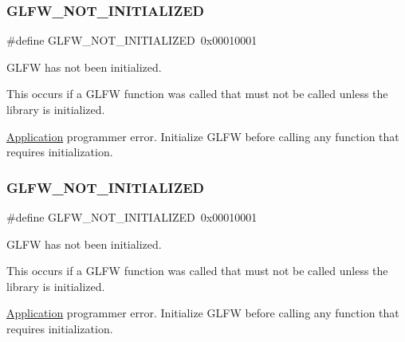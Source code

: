 \subsubsection{\texorpdfstring{G\+L\+F\+W\+\_\+\+N\+O\+T\+\_\+\+I\+N\+I\+T\+I\+A\+L\+I\+Z\+ED}{GLFW\_NOT\_INITIALIZED}\hspace{0.1cm}{\footnotesize\ttfamily [4/5]}}
{\footnotesize\ttfamily \#define G\+L\+F\+W\+\_\+\+N\+O\+T\+\_\+\+I\+N\+I\+T\+I\+A\+L\+I\+Z\+ED~0x00010001}



G\+L\+FW has not been initialized. 

This occurs if a G\+L\+FW function was called that must not be called unless the library is initialized.

\hyperlink{classApplication}{Application} programmer error. Initialize G\+L\+FW before calling any function that requires initialization. \mbox{\label{group__errors_ga2374ee02c177f12e1fa76ff3ed15e14a}} 
\subsubsection{\texorpdfstring{G\+L\+F\+W\+\_\+\+N\+O\+T\+\_\+\+I\+N\+I\+T\+I\+A\+L\+I\+Z\+ED}{GLFW\_NOT\_INITIALIZED}\hspace{0.1cm}{\footnotesize\ttfamily [5/5]}}
{\footnotesize\ttfamily \#define G\+L\+F\+W\+\_\+\+N\+O\+T\+\_\+\+I\+N\+I\+T\+I\+A\+L\+I\+Z\+ED~0x00010001}



G\+L\+FW has not been initialized. 

This occurs if a G\+L\+FW function was called that must not be called unless the library is initialized.

\hyperlink{classApplication}{Application} programmer error. Initialize G\+L\+FW before calling any function that requires initialization. \mbox{\label{group__errors_ga9023953a2bcb98c2906afd071d21ee7f}} 
